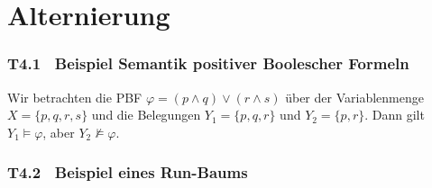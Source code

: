 \documentclass[fontsize=11pt, twoside=false, numbers=autoenddot]{scrbook}
\begin{document}
\part{Alternierung}

\section*{T4.1~ Beispiel Semantik positiver Boolescher Formeln}

Wir betrachten die PBF $\varphi = (p \land q) \lor (r \land s)$
über der Variablenmenge $X = \{p,q,r,s\}$
und die Belegungen $Y_1 = \{p,q,r\}$ und $Y_2 = \{p,r\}$.
Dann gilt $Y_1 \models \varphi$, aber $Y_2 \not\models \varphi$.

\section*{T4.2~ Beispiel eines Run-Baums}
\end{document}
